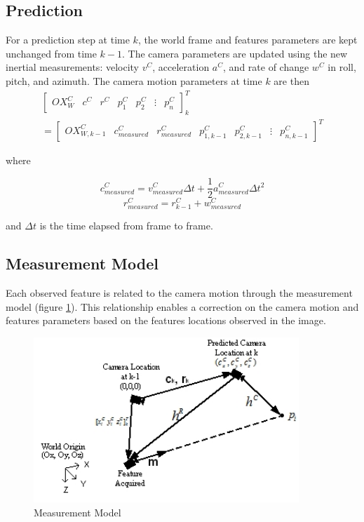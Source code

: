 \subsection{Prediction}

For a prediction step at time $k$, the world frame and features
parameters are kept unchanged from time $k-1$. The camera parameters
are updated using the new inertial measurements: velocity $v^{C}$,
acceleration $a^{C}$, and rate of change $w^{C}$ in roll, pitch, and
azimuth. The camera motion parameters at time $k$ are then
\begin{multline}
\begin{bmatrix}
OX_{W}^{C} & c^{C} & r^{C} & p_{1}^{C}& p_{2}^{C} & \vdots & p_n^C
\end{bmatrix}_{k}^T \\
=\begin{bmatrix}
OX_{W,k-1}^{C} & c_{measured}^{C} & r_{measured}^{C} & p_{1,k-1}^{C} &
p_{2,k-1}^{C} & \vdots & p_{n,k-1}^C
\end{bmatrix}^T
\end{multline}

\noindent where 

$$c_{measured}^{C}=v_{measured}^{C}\Delta t+ \frac{1}{2}a_{measured}^{C}\Delta t^{2}$$
$$r_{measured}^{C}=r_{k-1}^{C}+ w_{measured}^{C}$$

\noindent and $\Delta t$ is the time elapsed from frame to frame. 

\subsection{Measurement Model}

Each observed feature is related to the camera motion through the
measurement model (figure \ref{fig:measurement_model}). This
relationship enables a correction on the camera motion and features
parameters based on the features locations observed in the image.

\begin{figure}[h]
\centering
\includegraphics[width=10cm, keepaspectratio=true]{./Figures/measurement_model.jpg}
\caption{Measurement Model}
\label{fig:measurement_model}
\end{figure}

